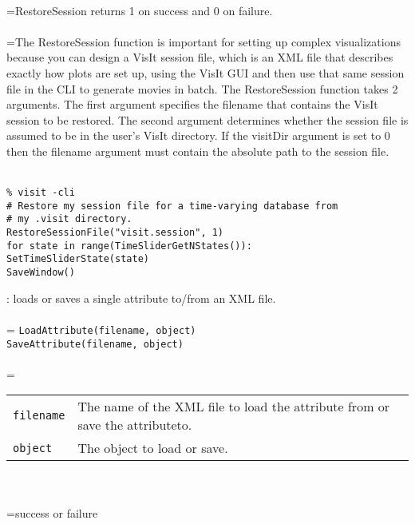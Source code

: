 \documentclass[10pt,a4paper]{report}
\begin{document}
 \\ 
\hangindent=\parindent RestoreSession returns 1 on success and 0 on failure. \\[-3mm] 

 \\ 
\hangindent=\parindent The RestoreSession function is important for setting up complex visualizations because you can design a VisIt session file, which is an XML file that describes exactly how plots are set up, using the VisIt GUI and then use that same session file in the CLI to generate movies in batch. The RestoreSession function takes 2 arguments. The first argument specifies the filename that contains the VisIt session to be restored. The second argument determines whether the session file is assumed to be in the user's VisIt directory. If the visitDir argument is set to 0 then the filename argument must contain the absolute path to the session file. \\[-3mm] 

\\[-6mm]
\begin{verbatim}% visit -cli
# Restore my session file for a time-varying database from 
# my .visit directory.
RestoreSessionFile("visit.session", 1)
for state in range(TimeSliderGetNStates()):
SetTimeSliderState(state)
SaveWindow()
\end{verbatim}
\newpage


{}
: loads or saves a single attribute to/from an XML file.\\[-3mm]

 \\ 
\hangindent=\parindent 
\verb!LoadAttribute(filename, object)!\\ 
\verb!SaveAttribute(filename, object)!\\ [-3mm]

 \\ 
\hangindent=\parindent 
\begin{tabular}{lp{9cm}}
\verb!filename! & The name of the XML file to load the attribute from or save the attributeto. \\
\verb!object! & The object to load or save. \\
\end{tabular} \\[-2mm]


 \\ 
\hangindent=\parindent success or failure \\[-3mm] 
\end{document}
